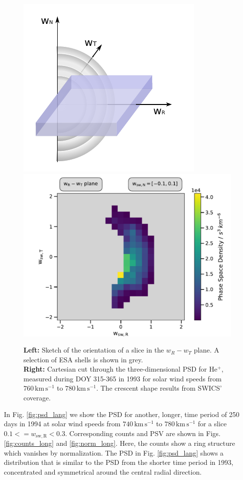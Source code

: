 \begin{figure}[h]
	\includegraphics[width=.34\textwidth]{Figures/sketch_slice_N2.pdf}
	\includegraphics[width=.64\textwidth]{Figures/slice_50_N.pdf}
	\centering
	\caption{\textbf{Left:} Sketch of the orientation of a slice in the $w_R - w_T$ plane. A selection of ESA shells is shown in grey.\\ \textbf{Right:} Cartesian cut through the three-dimensional PSD for $\mathrm{He^{+}}$, measured during DOY 315-365 in 1993 for solar wind speeds from $760 \, \mathrm{km\,s^{-1}}$ to $780 \, \mathrm{km\,s^{-1}}$. The crescent shape results from SWICS' coverage.}
	\label{fig:sketch_slice_N}
\end{figure}
%
%
%
%
%
\clearpage
\noindent In Fig. \ref{fig:psd_lang} we show the PSD for another, longer, time period of 250 days in 1994 at solar wind speeds from $740 \, \mathrm{km\,s^{-1}}$ to $780 \, \mathrm{km\,s^{-1}}$ for a slice $0.1 <= w_\mathrm{sw,R} < 0.3$. Corresponding counts and PSV are shown in Figs. \ref{fig:counts_long} and \ref{fig:norm_long}. Here, the counts show a ring structure which vanishes by normalization. 
The PSD in  Fig. \ref{fig:psd_lang} shows a distribution that is similar to the PSD from the shorter time period in 1993, concentrated and symmetrical around the central radial direction.
